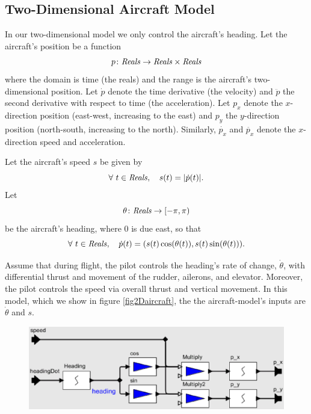 \documentclass[11pt]{article}
\begin{document}


\subsection{Two-Dimensional Aircraft Model}

In our two-dimensional model we only control the aircraft's heading.
Let the aircraft's position be a function
\[
p \colon \mbox{\textit{Reals}} \to \mbox{\textit{Reals}} \times \mbox{\textit{Reals}}
\]
where the domain is time (the reals) and the range is the aircraft's
two-dimensional position.  Let $\dot{p}$ denote the time derivative
(the velocity) and $\ddot{p}$ the second derivative with respect to
time (the acceleration). Let $p_x$ denote the $x$-direction position
(east-west, increasing to the east) and $p_y$ the $y$-direction
position (north-south, increasing to the north). Similarly,
$\dot{p_x}$ and $\ddot{p_x}$ denote the $x$-direction speed and
acceleration.

Let the aircraft's speed $s$ be given by
\[
\forall ~ t \in \mbox{\textit{Reals}}, \quad
s(t) = |\dot{p}(t)| .
\]
Let
\[
\theta \colon \mbox{\textit{Reals}} \to [-\pi, \pi)
\]
be the aircraft's heading, where $0$ is due east, so that
\[
\forall ~ t \in \mbox{\textit{Reals}}, \quad
\dot{p} (t) = (s(t) \cos(\theta (t)), s(t) \sin(\theta(t))) .
\]

Assume that during flight, the pilot controls the heading's rate of
change, $\dot{\theta}$, with differential thrust and movement of the
rudder, ailerons, and elevator.  Moreover, the pilot controls the
speed via overall thrust and vertical movement.  In this model, which
we show in figure \ref{fig2Daircraft}, the the aircraft-model's inputs
are $\dot{\theta}$ and $s$.

\begin{figure}[btp]
\centering
\includegraphics[width=5in]{fig2Daircraft.eps}
\end{figure}

\end{document}
